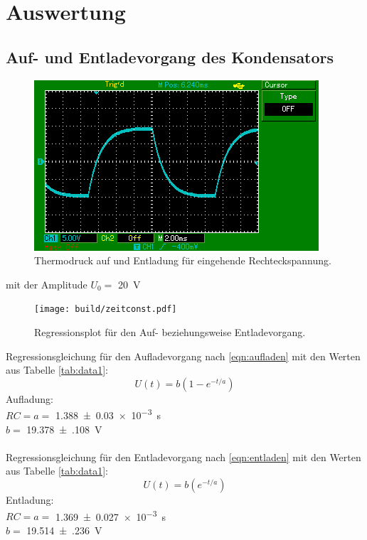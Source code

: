 \section{Auswertung}
\label{sec:Auswertung}

\subsection{Auf- und Entladevorgang des Kondensators}

\begin{figure}[H]
  \centering
  \includegraphics{content/images/a/ladekurve.png}
  \caption{Thermodruck auf und Entladung für eingehende Rechteckspannung.}
  \label{fig:lade}
\end{figure}
mit der Amplitude $U_0=$ \SI{20}{\volt}
\begin{figure}[H]
  \centering
  \texttt{[image: build/zeitconst.pdf]}
  \caption{Regressionsplot für den Auf- beziehungsweise Entladevorgang.}
  \label{fig:lade_plot}
\end{figure}
Regressionsgleichung für den Aufladevorgang nach \eqref{eqn:aufladen}
mit den Werten aus Tabelle \ref{tab:data1}:
\begin{equation}
  U(t)=b\left(1-e^{-t/a}\right)
\end{equation}
Aufladung:\\
$RC=a=$ \SI{1.388(30)e-3}{\second}\\
$b=$ \SI{19.378(108)}{\volt}\\\\
Regressionsgleichung für den Entladevorgang nach \eqref{eqn:entladen}
mit den Werten aus Tabelle \ref{tab:data1}:
\begin{equation}
  U(t)=b\left(e^{-t/a}\right)
\end{equation}
Entladung: \\
$RC=a=$ \SI{1.369(27)e-3}{\second}\\
$b=$ \SI{19.514(236)}{\volt}

